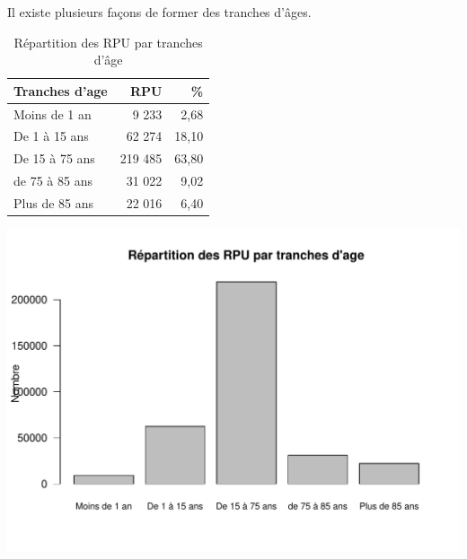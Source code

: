 \documentclass[12pt,english,french,twoside]{book}\usepackage[]{graphicx}\usepackage[]{color}
\makeatletter
\def\maxwidth{ %
  \ifdim\Gin@nat@width>\linewidth
    \linewidth
  \else
    \Gin@nat@width
  \fi
}
\newenvironment{knitrout}{}{} %
\makeatother
\begin{document}
Il existe plusieurs façons de former des tranches d'âges.


\begin{table}[ht]
\centering
\begin{tabular}{lrr}
  \hline
Tranches d'age & RPU & \%  \\ 
  \hline
Moins de 1 an & 9 233 & 2,68 \\ 
  De 1 à 15 ans & 62 274 & 18,10 \\ 
  De 15 à 75 ans & 219 485 & 63,80 \\ 
  de 75 à 85 ans & 31 022 & 9,02 \\ 
  Plus de 85 ans & 22 016 & 6,40 \\ 
   \hline
\end{tabular}
\caption[Répartition des RPU par tranches d'âge]{Répartition des RPU par tranches d'âge} 
\label{tab:tranche}
\end{table}


\begin{center}
\begin{knitrout}
\color{fgcolor}
\includegraphics[width=\maxwidth]{figure/tranches_age1-1} 

\end{knitrout}
\label{fig:tranches_age1}
\end{center}

\end{document}
